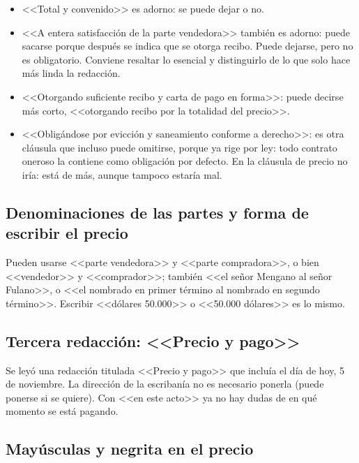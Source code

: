 \documentclass[12pt,oneside]{book}
\begin{document}
\begin{itemize}
    \item <<Total y convenido>> es adorno: se puede dejar o no.
    \item <<A entera satisfacci\'on de la parte vendedora>> tambi\'en es adorno: puede sacarse porque despu\'es se indica que se otorga recibo. Puede dejarse, pero no es obligatorio. Conviene resaltar lo esencial y distinguirlo de lo que solo hace m\'as linda la redacci\'on.
    \item <<Otorgando suficiente recibo y carta de pago en forma>>: puede decirse m\'as corto, <<otorgando recibo por la totalidad del precio>>.
    \item <<Oblig\'andose por evicci\'on y saneamiento conforme a derecho>>: es otra cl\'ausula que incluso puede omitirse, porque ya rige por ley: todo contrato oneroso la contiene como obligaci\'on por defecto. En la cl\'ausula de precio no ir\'ia: est\'a de m\'as, aunque tampoco estar\'ia mal.
\end{itemize}

\subsection{Denominaciones de las partes y forma de escribir el precio}

Pueden usarse <<parte vendedora>> y <<parte compradora>>, o bien <<vendedor>> y <<comprador>>; tambi\'en <<el se\~nor Mengano al se\~nor Fulano>>, o <<el nombrado en primer t\'ermino al nombrado en segundo t\'ermino>>. Escribir <<d\'olares 50.000>> o <<50.000 d\'olares>> es lo mismo.

\subsection{Tercera redacci\'on: <<Precio y pago>>}

Se ley\'o una redacci\'on titulada <<Precio y pago>> que inclu\'ia el d\'ia de hoy, 5 de noviembre. La direcci\'on de la escriban\'ia no es necesario ponerla (puede ponerse si se quiere). Con <<en este acto>> ya no hay dudas de en qu\'e momento se est\'a pagando.


\subsection{May\'usculas y negrita en el precio}
\end{document}
